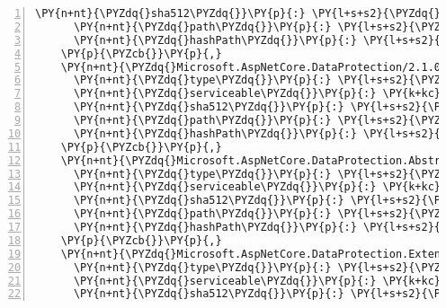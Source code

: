 \begin{Verbatim}[commandchars=\\\{\},numbers=left,firstnumber=1,stepnumber=1,numberblanklines=0]
      \PY{n+nt}{\PYZdq{}sha512\PYZdq{}}\PY{p}{:} \PY{l+s+s2}{\PYZdq{}sha512\PYZhy{}LsU1uXs9ehqIFZbZ2nr9e6eaYBc1qVcmVy5Z1zAlXbUwCnlVFGCjXNqQBBNiU1vT5p7rBFinRPixiE5X3DOXCg==\PYZdq{}}\PY{p}{,}
      \PY{n+nt}{\PYZdq{}path\PYZdq{}}\PY{p}{:} \PY{l+s+s2}{\PYZdq{}microsoft.aspnetcore.cryptography.keyderivation/2.1.0\PYZhy{}rc1\PYZhy{}final\PYZdq{}}\PY{p}{,}
      \PY{n+nt}{\PYZdq{}hashPath\PYZdq{}}\PY{p}{:} \PY{l+s+s2}{\PYZdq{}microsoft.aspnetcore.cryptography.keyderivation.2.1.0\PYZhy{}rc1\PYZhy{}final.nupkg.sha512\PYZdq{}}
    \PY{p}{\PYZcb{}}\PY{p}{,}
    \PY{n+nt}{\PYZdq{}Microsoft.AspNetCore.DataProtection/2.1.0\PYZhy{}rc1\PYZhy{}final\PYZdq{}}\PY{p}{:} \PY{p}{\PYZob{}}
      \PY{n+nt}{\PYZdq{}type\PYZdq{}}\PY{p}{:} \PY{l+s+s2}{\PYZdq{}package\PYZdq{}}\PY{p}{,}
      \PY{n+nt}{\PYZdq{}serviceable\PYZdq{}}\PY{p}{:} \PY{k+kc}{true}\PY{p}{,}
      \PY{n+nt}{\PYZdq{}sha512\PYZdq{}}\PY{p}{:} \PY{l+s+s2}{\PYZdq{}sha512\PYZhy{}zqaWgHzbNxhrFO9aPVfHcKcE32IWBSF3NSP4Mtn7Q3RIu2jwzf4OEUJnNJrIUj3XR0rO2oKrcRQ7/VOGmqRgEA==\PYZdq{}}\PY{p}{,}
      \PY{n+nt}{\PYZdq{}path\PYZdq{}}\PY{p}{:} \PY{l+s+s2}{\PYZdq{}microsoft.aspnetcore.dataprotection/2.1.0\PYZhy{}rc1\PYZhy{}final\PYZdq{}}\PY{p}{,}
      \PY{n+nt}{\PYZdq{}hashPath\PYZdq{}}\PY{p}{:} \PY{l+s+s2}{\PYZdq{}microsoft.aspnetcore.dataprotection.2.1.0\PYZhy{}rc1\PYZhy{}final.nupkg.sha512\PYZdq{}}
    \PY{p}{\PYZcb{}}\PY{p}{,}
    \PY{n+nt}{\PYZdq{}Microsoft.AspNetCore.DataProtection.Abstractions/2.1.0\PYZhy{}rc1\PYZhy{}final\PYZdq{}}\PY{p}{:} \PY{p}{\PYZob{}}
      \PY{n+nt}{\PYZdq{}type\PYZdq{}}\PY{p}{:} \PY{l+s+s2}{\PYZdq{}package\PYZdq{}}\PY{p}{,}
      \PY{n+nt}{\PYZdq{}serviceable\PYZdq{}}\PY{p}{:} \PY{k+kc}{true}\PY{p}{,}
      \PY{n+nt}{\PYZdq{}sha512\PYZdq{}}\PY{p}{:} \PY{l+s+s2}{\PYZdq{}sha512\PYZhy{}J/vuUkBoRttZGOeINvuFer/sBgr+9coOxsoi0yKa1jTbT/Ty+5MXxJX+rR9hGb54h/omsfLfm3IWM9ZW+xO4Ew==\PYZdq{}}\PY{p}{,}
      \PY{n+nt}{\PYZdq{}path\PYZdq{}}\PY{p}{:} \PY{l+s+s2}{\PYZdq{}microsoft.aspnetcore.dataprotection.abstractions/2.1.0\PYZhy{}rc1\PYZhy{}final\PYZdq{}}\PY{p}{,}
      \PY{n+nt}{\PYZdq{}hashPath\PYZdq{}}\PY{p}{:} \PY{l+s+s2}{\PYZdq{}microsoft.aspnetcore.dataprotection.abstractions.2.1.0\PYZhy{}rc1\PYZhy{}final.nupkg.sha512\PYZdq{}}
    \PY{p}{\PYZcb{}}\PY{p}{,}
    \PY{n+nt}{\PYZdq{}Microsoft.AspNetCore.DataProtection.Extensions/2.1.0\PYZhy{}rc1\PYZhy{}final\PYZdq{}}\PY{p}{:} \PY{p}{\PYZob{}}
      \PY{n+nt}{\PYZdq{}type\PYZdq{}}\PY{p}{:} \PY{l+s+s2}{\PYZdq{}package\PYZdq{}}\PY{p}{,}
      \PY{n+nt}{\PYZdq{}serviceable\PYZdq{}}\PY{p}{:} \PY{k+kc}{true}\PY{p}{,}
      \PY{n+nt}{\PYZdq{}sha512\PYZdq{}}\PY{p}{:} \PY{l+s+s2}{\PYZdq{}sha512\PYZhy{}e9b/YBph0eyhUBPRvr1tbuQDm435Fddmk1kC+68FRiOJ6FG4Jh5FXuRglIZF4DjOqQ+YmFbvZKzrr6MqjY0rUA==\PYZdq{}}\PY{p}{,}

\end{Verbatim}
